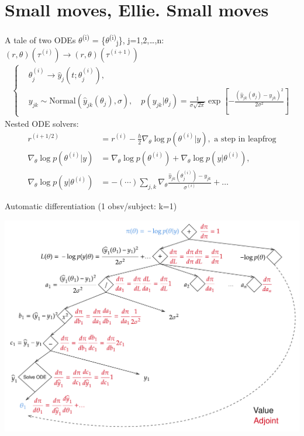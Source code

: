 \documentclass[bigger]{beamer}
\begin{document}
\section{Small moves, Ellie. Small moves}
\label{sec:orgbfceb19}
\begin{frame}[label={sec:orgf0972b3}]{A tale of two ODEs}
\(\theta\)\textsuperscript{(i)} = \{\(\theta\)\textsuperscript{(i)}\textsubscript{j}\}, j=1,2,\dots{},n: \((r, \theta)(\tau^{(i)}) \rightarrow (r, \theta)(\tau^{(i+1)})\)
\begin{align*}
\begin{cases}
  &\theta^{(i)}_j \rightarrow \hat{y}_j(t; \theta^{(i)}_j),\\
  &y_{jk} \sim \text{Normal}(\hat{y}_{jk}(\theta_j), \sigma),\quad p(y_{jk}|\theta_j) = \frac{1}{\sigma\sqrt{2\pi}}\exp{\left[-\frac{(\hat{y}_{jk}(\theta_j)-y_{jk})^2}{2\sigma^2}\right]}
\end{cases}
\end{align*}
Nested ODE solvers:
\begin{align*}
  r^{(i+1/2)} &= r^{(i)} - \frac{h}{2}\nabla_{\theta} \log{p(\theta^{(i)} | y)},\text{  a step in leapfrog}\\
  \nabla_{\theta} \log{p(\theta^{(i)} | y)} &= \nabla_{\theta} \log{p(\theta^{(i)})} + \nabla_{\theta} \log{p(y | \theta^{(i)})},\\
  \nabla_{\theta} \log{p(y | \theta^{(i)})} &= - (\cdots)\sum_{j,k}\nabla_{\theta} \frac{\hat{y}_{jk}(\theta_j^{(i)}) - y_{jk}}{\sigma^{(i)}} + \dots
\end{align*}
\end{frame}

\begin{frame}[label={sec:org4b14711}]{Automatic differentiation (1 obsv/subject: k=1)}
\begin{center}
\includegraphics[width=\textwidth]{./figure/autodiff_diag.pdf}
\end{center}
\end{frame}
\end{document}
